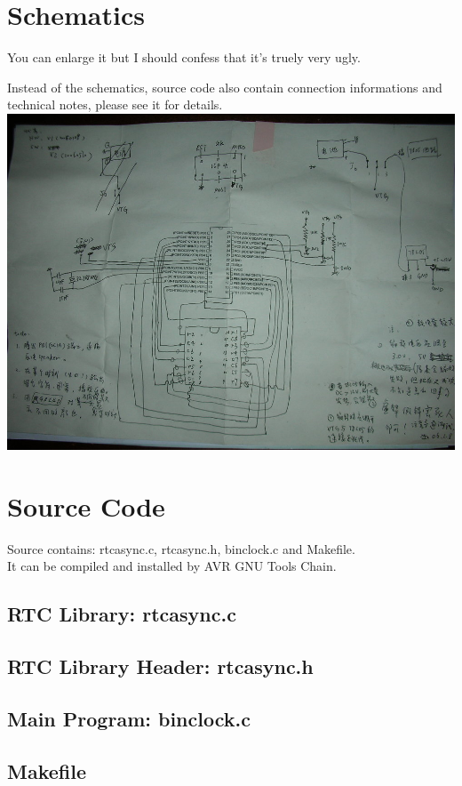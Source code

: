 \documentclass[11pt,a4paper]{article}
\begin{document}
\section{Schematics}
You can enlarge it but I should confess that it's truely very ugly.

Instead of the schematics, source code also contain connection informations
and technical notes, please see it for details.\\

\includegraphics[scale=0.5]{binclock_sch.jpg}

\section{Source Code}
Source contains: rtcasync.c, rtcasync.h, binclock.c and Makefile.\\
It can be compiled and installed by AVR GNU Tools Chain.
\subsection{RTC Library: rtcasync.c}


\subsection{RTC Library Header: rtcasync.h}


\subsection{Main Program: binclock.c}


\subsection{Makefile}

\end{document}
